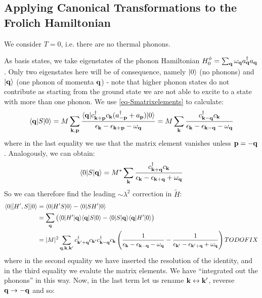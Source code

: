 \subsection{Applying Canonical Transformations to the Frolich Hamiltonian}
We consider $T = 0$, i.e. there are no thermal phonons.

As basis states, we take eigenstates of the phonon Hamiltonian $H^{\phi}_0 = \sum_{\mathbf{q}} \omega_{\mathbf{q}} a^\dagger_{\mathbf{q}} a_{\mathbf{q}}$. Only two eigenstates here will be of consequence, namely $\lvert 0 \rangle$ (no phonons) and $\lvert \mathbf{q} \rangle$ (one phonon of momenta $\mathbf{q}$) - note that higher phonon states do not contribute as starting from the ground state we are not able to excite to a state with more than one phonon. We use \eqref{eq-Smatrixelements} to calculate:
\begin{equation}
    \begin{split}
        \langle \mathbf{q} \rvert S\lvert 0 \rangle = M\sum_{\mathbf{k}, \mathbf{p}} \frac{\langle \mathbf{q} \rvert c^\dagger_{\mathbf{k} + \mathbf{p}}c_{\mathbf{k}}(a^\dagger_{-\mathbf{p}} + a_{\mathbf{p}})\lvert 0 \rangle}{\epsilon_{\mathbf{k}} - \epsilon_{\mathbf{k} + \mathbf{p}} - \omega_{\mathbf{q}}} = M\sum_{\mathbf{k}} \frac{c^\dagger_{\mathbf{k} - \mathbf{q}}c_{\mathbf{k}}}{\epsilon_{\mathbf{k}} - \epsilon_{\mathbf{k} - \mathbf{q}} - \omega_{\mathbf{q}}}
    \end{split}
\end{equation}
where in the last equality we use that the matrix element vanishes unless $\mathbf{p} = -\mathbf{q}$. Analogously, we can obtain:
\begin{equation}
    \langle 0 \rvert S\lvert \mathbf{q} \rangle = M^* \sum_{\mathbf{k}}\frac{c^\dagger_{\mathbf{k} + \mathbf{q}}c_{\mathbf{k}}}{\epsilon_{\mathbf{k}} - \epsilon_{\mathbf{k} + \mathbf{q}} + \omega_{\mathbf{q}}}
\end{equation}
So we can therefore find the leading $\sim \lambda^2$ correction in $\tilde{H}$:
\begin{equation}
    \begin{split}
        \langle 0 \rvert[H', S]\lvert 0 \rangle &= \langle 0 \rvert H'S\lvert 0 \rangle - \langle 0 \rvert SH'\lvert 0 \rangle
        \\ &= \sum_{\mathbf{q}}\left(\langle 0 \rvert H'\lvert \mathbf{q} \rangle\langle \mathbf{q} \rvert S\lvert 0 \rangle - \langle 0 \rvert S\lvert \mathbf{q} \rangle\langle \mathbf{q} \rvert H'\lvert 0 \rangle\right)
        \\ &= \lvert M \rvert^2\sum_{\mathbf{q}, \mathbf{k}, \mathbf{k}'}c^\dagger_{\mathbf{k}' + \mathbf{q}}c_{\mathbf{k'}}c^\dagger_{\mathbf{k} - \mathbf{q}}c_{\mathbf{k}}\left(\frac{1}{\epsilon_{\mathbf{k}} - \epsilon_{\mathbf{k} - \mathbf{q}} - \omega_{\mathbf{q}}} - \frac{1}{\epsilon_{\mathbf{k}'} - \epsilon_{\mathbf{k}' + \mathbf{q}} + \omega_{\mathbf{q}}}\right) TODO FIX
    \end{split}
\end{equation}
where in the second equality we have inserted the resolution of the identity, and in the third equality we evalute the matrix elements. We have ``integrated out the phonons'' in this way. Now, in the last term let us rename $\mathbf{k} \leftrightarrow \mathbf{k}'$, reverse $\mathbf{q} \to -\mathbf{q}$ and so:

